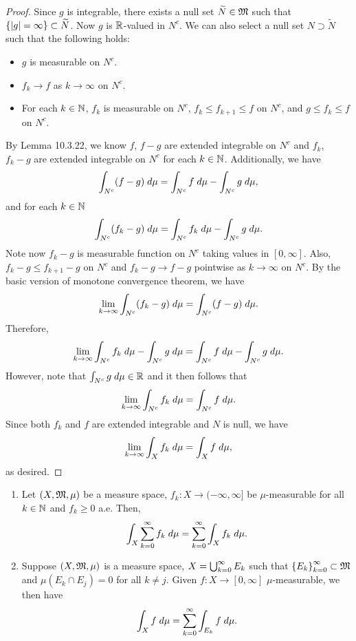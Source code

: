 \documentclass[a4paper]{article}
\begin{document}
\begin{proof}
Since $g$ is integrable, there exists a null set $\widetilde{N} \in \mathfrak{M}$
such that $\left\{ \left\lvert g\right\rvert = \infty \right\} \subset \widetilde{N}$.
Now $g$ is $\mathbb{R}$-valued in $N^c$.
We can also select a null set $N \supset \tilde{N}$
such that the following holds: 
\begin{itemize}
  \item $g$ is measurable on $N^c$.
  \item $f_k \to f$ as $k \to \infty$ on $N^c$.
  \item For each $k \in \mathbb{N}$, $f_k$ is measurable
  on $N^c$, $f_k \leq f_{k+1} \leq f$ on $N^c$, and 
  $g \leq f_k \leq f$ on $N^c$.
\end{itemize}
By Lemma 10.3.22, we know $f$, $f - g$ are extended 
integrable on $N^c$ and $f_k$, $f_k - g$ are extended integrable
on $N^c$ for each $k \in \mathbb{N}$. Additionally, we have 
\[
\int_{N^c} (f - g) \; d \mu = \int_{N^c} f \; d \mu - \int_{N^c}
g \; d \mu,
\]
and for each $k \in \mathbb{N}$ 
\[
\int_{N^c} (f_k - g) \; d \mu = \int_{N^c} f_k \; d \mu
- \int_{N^c} g \; d \mu.
\]
Note now $f_k - g$ is measurable function on $N^c$
taking values in $[0, \infty]$. Also, 
$f_k - g \leq f_{k+1} - g$ on $N^c$ and $f_k - g \to f - g$
pointwise as $k \to \infty$ on $N^c$. By the basic version 
of monotone convergence theorem, we have 
\[
\lim_{k \to \infty} \int_{N^c} (f_k - g) \; d \mu 
= \int_{N^c} (f - g) \; d \mu.
\]
Therefore, 
\[
\lim_{k \to \infty} \int_{N^c} f_k \; d \mu
- \int_{N^c} g \; d \mu = \int_{N^c} f \; d \mu
- \int_{N^c} g \; d \mu.
\]
However, note that $\int_{N^c} g \; d \mu \in \mathbb{R}$
and it then follows that
\[
\lim_{k \to \infty} \int_{N^c} f_k \; d \mu = 
\int_{N^c} f \; d \mu.
\]
Since both $f_k$ and $f$ are extended integrable and 
$N$ is null, we have 
\[
\lim_{k \to \infty} \int_X f_k \; d \mu = \int_X f \; d \mu,
\]
as desired.

\end{proof}

\begin{cor}
\begin{enumerate}
  \item Let $(X, \mathfrak{M}, \mu)$ be a measure space, $f_k : X \to (-\infty, \infty]$
  be $\mu$-measurable for all $k \in \mathbb{N}$ and $f_k \geq 0$ a.e. 
  Then, 
  \[
  \int_X \sum_{k=0}^\infty f_k \; d \mu = \sum_{k=0}^\infty \int_X f_k \; d \mu.
  \]
  
  \item Suppose $(X, \mathfrak{M}, \mu)$ is a measure space, $X = \bigcup_{k=0}^\infty E_k$
  such that $\left\{ E_k \right\}_{k=0}^\infty \subset \mathfrak{M}$ and $\mu \left( E_k \cap E_j \right)
  = 0$ for all $k \neq j$. Given $f: X \to [0, \infty]$
  $\mu$-measurable, we then have 
  \[
  \int_X f \; d \mu = \sum_{k=0}^\infty \int_{E_k} f \; d \mu.
  \]
\end{enumerate}
\end{cor}
\end{document}
